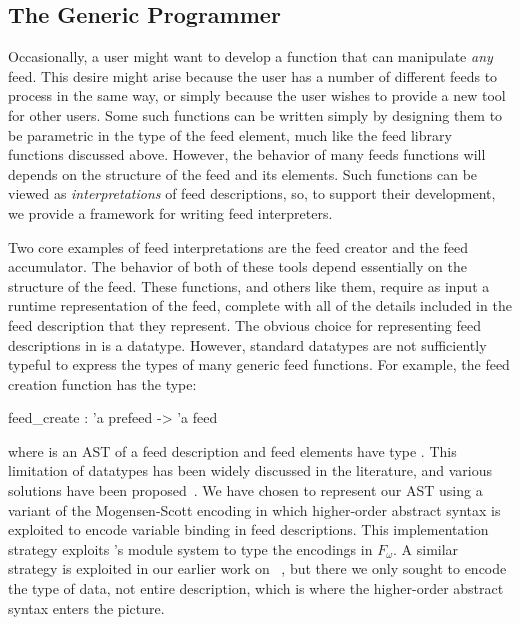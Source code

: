 \subsection{The Generic Programmer}


Occasionally, a user might want to develop a function that can
manipulate {\it any} feed. This desire might arise because the user
has a number of different feeds to process in the same way, or simply
because the user wishes to provide a new tool for other \padsd{}
users. Some such functions can be written simply by designing them to
be parametric in the type of the feed element, much like the feed
library functions discussed above. However, the behavior of many feeds
functions will depends on the structure of the feed and its
elements. Such functions can be viewed as {\it interpretations} of
feed descriptions, so, to support their development, we provide a
framework for writing feed interpreters.


Two core examples of feed interpretations are the feed creator and the
feed accumulator. The behavior of both of these tools depend
essentially on the structure of the feed. These functions, and others
like them, require as input a runtime representation of the feed,
complete with all of the details included in the feed description that
they represent. The obvious choice for representing feed descriptions
in \ocaml is a datatype. However, standard \ocaml datatypes are not
sufficiently typeful to express the types of many generic feed
functions. For example, the feed creation function has the type:
\begin{code}
feed_create : 'a prefeed -> 'a feed
\end{code} where  is an AST of a feed description and feed 
elements have type .
%
%
This limitation of datatypes has been widely discussed in the
literature, and various solutions have been 
proposed~\cite{yang:icfp98,weirich:encodingtypecase,hinz:icfp04,padsml-padl}. We have 
chosen to represent our AST using a variant of the Mogensen-Scott
encoding in which higher-order abstract syntax is exploited 
to encode variable binding in feed descriptions.  This implementation strategy 
exploits \ocaml's module system to type the encodings in $F_\omega$. 
A similar strategy is exploited in our earlier work on \padsml~\cite{padsml-padl}, 
but there we only sought to encode the \ocaml type of data, not entire \padsml
description, which is where the higher-order abstract syntax enters the picture.

